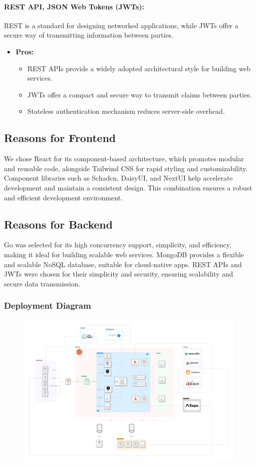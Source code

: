 \documentclass[11pt,a4paper]{article}
\begin{document}
\paragraph{REST API, JSON Web Tokens (JWTs):} REST is a standard for designing networked applications, while JWTs offer a secure way of transmitting information between parties.
\begin{itemize}
    \item \textbf{Pros:}
    \begin{itemize}
        \item REST APIs provide a widely adopted architectural style for building web services.
        \item JWTs offer a compact and secure way to transmit claims between parties.
        \item Stateless authentication mechanism reduces server-side overhead.
    \end{itemize}
\end{itemize}

\subsection*{Reasons for Frontend}
We chose React for its component-based architecture, which promotes modular and reusable code, alongside Tailwind CSS for rapid styling and customizability. Component libraries such as Schadcn, DaisyUI, and NextUI help accelerate development and maintain a consistent design. This combination ensures a robust and efficient development environment.

\subsection*{Reasons for Backend}
Go was selected for its high concurrency support, simplicity, and efficiency, making it ideal for building scalable web services. MongoDB provides a flexible and scalable NoSQL database, suitable for cloud-native apps. REST APIs and JWTs were chosen for their simplicity and security, ensuring scalability and secure data transmission.

\subsubsection*{Deployment Diagram}
\begin{figure}[htbp]
    \centering
    \includegraphics[width=1\textwidth]{Occupi Deployment model.png}
\end{figure}
\end{document}
